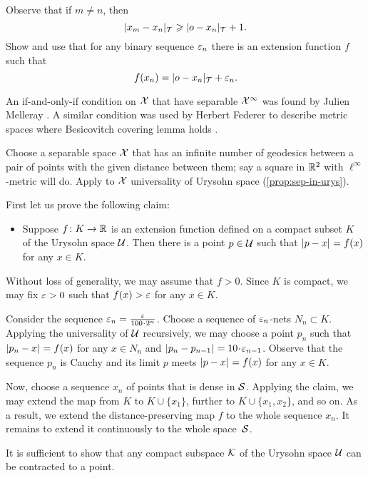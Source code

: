 Observe that if $m\ne n$, then
\[|x_m-x_n|_{\mathcal{T}}\geqslant |o-x_n|_{\mathcal{T}}+1.\]
Show and use that for any binary sequence $\varepsilon_n$ there is an extension function $f$ such that 
\[f(x_n)=|o-x_n|_{\mathcal{T}}+\varepsilon_n.\]


An if-and-only-if condition on $\mathcal{X}$ that have separable $\mathcal{X}^\infty$ was found by Julien Melleray \cite[2.8]{melleray}.
A similar condition was used by Herbert Federer to describe metric spaces where Besicovitch covering lemma holds \cite[2.8.9]{federer}.

Choose a separable space $\mathcal{X}$ that has an infinite number of geodesics between a pair of points with the given distance between them;
say a square in $\mathbb{R}^2$ with $\ell^\infty$-metric will do.
Apply to $\mathcal{X}$ universality of Urysohn space (\ref{prop:sep-in-urys}).

First let us prove the following claim:

\begin{itemize}
\item 
Suppose $f\colon K\to\mathbb{R}$ is an extension function defined on a compact subset $K$ of the Urysohn space $\mathcal{U}$.
Then there is a point $p\in \mathcal{U}$ such that 
$\dist{p}{x}{}=f(x)$ for any $x\in K$.
\end{itemize}

Without loss of generality, we may assume that $f>0$.
Since $K$ is compact, we may fix $\varepsilon>0$ such that $f(x)>\varepsilon$ for any $x\in K$.

Consider the sequence $\eps_n=\tfrac\eps{100\cdot 2^n}$.
Choose a sequence of $\varepsilon_n$-nets $N_n\subset K$.
Applying the universality of $\mathcal{U}$ recursively, we may choose a point $p_n$ such that $\dist{p_n}{x}{}=f(x)$ for any $x\in N_n$ and $\dist{p_n}{p_{n-1}}{}\z=10\cdot\eps_{n-1}$.
Observe that the sequence $p_n$ is Cauchy and its limit $p$ meets 
$\dist{p}{x}{}=f(x)$ for any $x\in K$.

Now, choose a sequence $x_n$ of points that is dense in $\mathcal{S}$.
Applying the claim, we may extend the map from $K$ to $K\cup\{x_1\}$, further to $K\cup\{x_1,x_2\}$, and so on.
As a result, we extend the distance-preserving map $f$ to the whole sequence $x_n$.
It remains to extend it continuously to the whole space~$\mathcal{S}$.

It is sufficient to show that any compact subspace $\mathcal{K}$ of the Urysohn space $\mathcal{U}$ can be contracted to a point.

